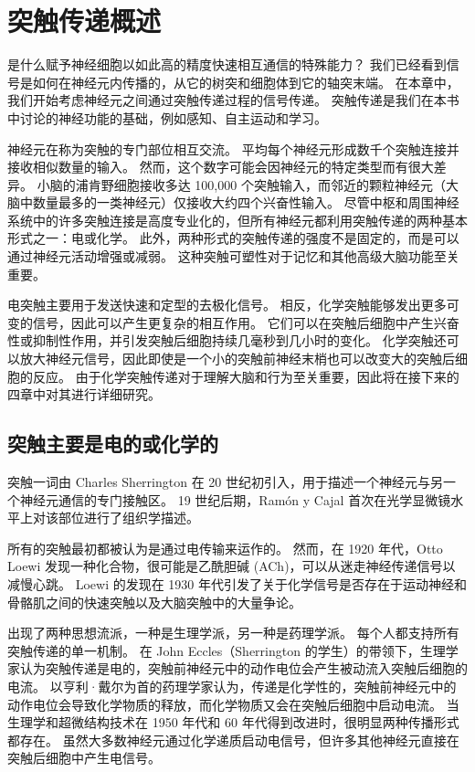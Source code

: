 \chapter{突触传递概述} \label{chap:chap11}
是什么赋予神经细胞以如此高的精度快速相互通信的特殊能力？ 
我们已经看到信号是如何在神经元内传播的，从它的树突和细胞体到它的轴突末端。 
在本章中，我们开始考虑神经元之间通过突触传递过程的信号传递。 
突触传递是我们在本书中讨论的神经功能的基础，例如感知、自主运动和学习。


神经元在称为突触的专门部位相互交流。 
平均每个神经元形成数千个突触连接并接收相似数量的输入。 
然而，这个数字可能会因神经元的特定类型而有很大差异。 小脑的浦肯野细胞接收多达 100,000 个突触输入，而邻近的颗粒神经元（大脑中数量最多的一类神经元）仅接收大约四个兴奋性输入。 
尽管中枢和周围神经系统中的许多突触连接是高度专业化的，但所有神经元都利用突触传递的两种基本形式之一：电或化学。 
此外，两种形式的突触传递的强度不是固定的，而是可以通过神经元活动增强或减弱。 
这种突触可塑性对于记忆和其他高级大脑功能至关重要。


电突触主要用于发送快速和定型的去极化信号。 
相反，化学突触能够发出更多可变的信号，因此可以产生更复杂的相互作用。 
它们可以在突触后细胞中产生兴奋性或抑制性作用，并引发突触后细胞持续几毫秒到几小时的变化。 
化学突触还可以放大神经元信号，因此即使是一个小的突触前神经末梢也可以改变大的突触后细胞的反应。 
由于化学突触传递对于理解大脑和行为至关重要，因此将在接下来的四章中对其进行详细研究。


\section{突触主要是电的或化学的}

突触一词由 Charles Sherrington 在 20 世纪初引入，用于描述一个神经元与另一个神经元通信的专门接触区。 
19 世纪后期，Ramón y Cajal 首次在光学显微镜水平上对该部位进行了组织学描述。


所有的突触最初都被认为是通过电传输来运作的。 
然而，在 1920 年代，Otto Loewi 发现一种化合物，很可能是乙酰胆碱 (ACh)，可以从迷走神经传递信号以减慢心跳。 
Loewi 的发现在 1930 年代引发了关于化学信号是否存在于运动神经和骨骼肌之间的快速突触以及大脑突触中的大量争论。


出现了两种思想流派，一种是生理学派，另一种是药理学派。 
每个人都支持所有突触传递的单一机制。 
在 John Eccles（Sherrington 的学生）的带领下，生理学家认为突触传递是电的，突触前神经元中的动作电位会产生被动流入突触后细胞的电流。 
以亨利·戴尔为首的药理学家认为，传递是化学性的，突触前神经元中的动作电位会导致化学物质的释放，而化学物质又会在突触后细胞中启动电流。 
当生理学和超微结构技术在 1950 年代和 60 年代得到改进时，很明显两种传播形式都存在。 
虽然大多数神经元通过化学递质启动电信号，但许多其他神经元直接在突触后细胞中产生电信号。


